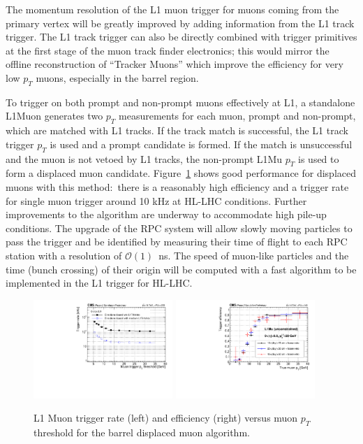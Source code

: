 The momentum resolution of the L1 muon trigger for muons coming from the primary vertex
will be greatly improved by adding information from the L1 track trigger. 
The L1 track trigger can also be directly combined with trigger primitives at the first stage of the muon
track finder electronics; this would mirror the offline reconstruction of ``Tracker Muons'' which
improve the efficiency for very low $p_T$ muons, especially in the barrel region.


To trigger on both prompt and non-prompt muons effectively at L1, a standalone L1Muon generates two $p_T$ measurements for each muon, prompt and
non-prompt, which are matched with L1 tracks. 
If the track match is successful, the L1 track trigger $p_T$ is used and a
prompt candidate is formed. 
If the match is unsuccessful and the muon is not vetoed by L1 tracks, the
non-prompt L1Mu $p_T$ is used to form a displaced muon candidate.
Figure~\ref{fig:cmsL1mu} shows good performance for displaced muons with this method:~there is a reasonably high efficiency and a
trigger rate for single muon trigger around 10 kHz at HL-LHC conditions. Further improvements to the algorithm are underway to accommodate high pile-up conditions. 
The upgrade of the RPC system will allow slowly moving particles to pass the trigger and be identified  by measuring their time of flight to each RPC station with a resolution of $\mathcal{O}(1)$~ns. 
The speed of muon-like particles and the time (bunch crossing) of their
origin will be computed with a fast algorithm to be implemented in the L1 trigger for HL-LHC.


\begin{figure}[t]
\begin{center}
  \includegraphics[width=0.47\textwidth]{figures/cmsupgrade/TDR-17-003_fig_7_11_a_Prompt_L1Mu_trigger_rate_pt__L1Mu__L1Mu2st__DisplacedL1MuDirectionBased_MB1_MB2_MB3_MB4_combined_eta0to0p9.pdf} \hfill
  \includegraphics[width=0.47\textwidth]{figures/cmsupgrade/TDR-17-003_fig_7_11_b_L1MuonTDR2017Displaced_L1MuPt20_SimMuPt_DT1_DT2_DT3_DT4_combined_eta0to0p9_dxy5to50_looseVeto.pdf}
  \caption{ L1 Muon trigger rate (left) and efficiency (right) versus muon $p_T$ threshold for the barrel displaced muon algorithm. 
 }
  \label{fig:cmsL1mu}
\end{center}
\end{figure}


